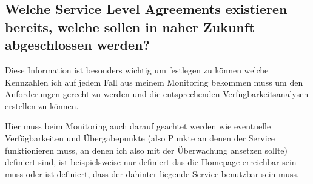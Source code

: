 \documentclass[12pt,a4paper,parskip,listof=totoc,bibliography=totoc]{scrreprt}
\begin{document}
	\subsection{Welche Service Level Agreements existieren bereits, welche sollen in naher Zukunft abgeschlossen werden?}
	Diese Information ist besonders wichtig um festlegen zu können welche Kennzahlen ich auf jedem Fall aus meinem Monitoring bekommen muss um den Anforderungen gerecht zu werden und die entsprechenden Verfügbarkeitsanalysen erstellen zu können.
	
	Hier muss beim Monitoring auch darauf geachtet werden wie eventuelle Verfügbarkeiten und Übergabepunkte (also Punkte an denen der Service funktionieren muss, an denen ich also mit der Überwachung ansetzen sollte) definiert sind, ist beispielsweise nur definiert das die Homepage erreichbar sein muss oder ist definiert, dass der dahinter liegende Service benutzbar sein muss.
\end{document}

